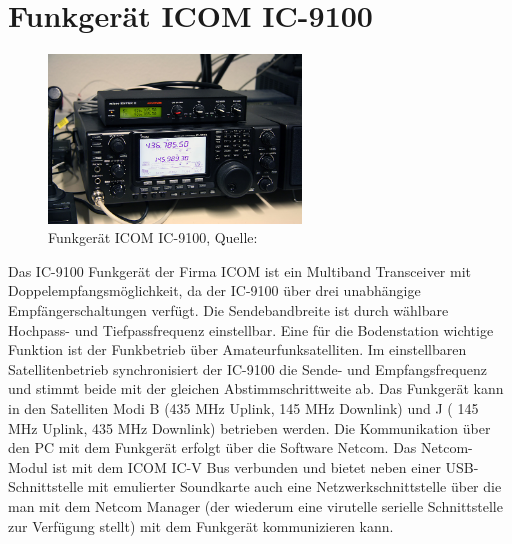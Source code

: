 \section{Funkgerät ICOM IC-9100}
\begin{figure}[h]
 \centering
 \includegraphics[width=0.6\textwidth]{images/radio}
 \caption{Funkgerät ICOM IC-9100, Quelle: \cite{dk0te}}
 \label{fig:radio}
\end{figure}
Das IC-9100 Funkgerät der Firma ICOM ist ein Multiband Transceiver mit Doppelempfangsmöglichkeit, da der IC-9100 über drei unabhängige 
Empfängerschaltungen verfügt. Die Sendebandbreite ist durch wählbare Hochpass- und Tiefpassfrequenz einstellbar. Eine für die Bodenstation wichtige 
Funktion ist der Funkbetrieb über Amateurfunksatelliten. Im einstellbaren Satellitenbetrieb synchronisiert der IC-9100 die Sende-  und 
Empfangsfrequenz und stimmt beide mit der gleichen Abstimmschrittweite ab. Das Funkgerät kann in den Satelliten Modi B (435 MHz Uplink, 145 MHz 
Downlink) und J ( 145 MHz Uplink, 435 MHz Downlink) betrieben werden. Die Kommunikation über den PC mit dem Funkgerät erfolgt über die Software 
Netcom.  Das Netcom-Modul ist mit dem ICOM IC-V Bus verbunden und bietet neben einer USB-Schnittstelle mit emulierter 
Soundkarte auch eine Netzwerkschnittstelle über die man mit dem Netcom Manager (der wiederum eine virutelle serielle Schnittstelle zur Verfügung 
stellt) mit dem Funkgerät kommunizieren kann.

  


 
